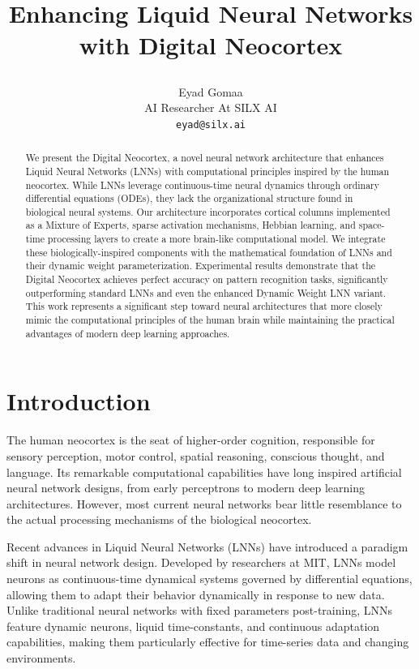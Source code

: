 \documentclass{article}
\title{Enhancing Liquid Neural Networks with Digital Neocortex

}
\author{
  Eyad Gomaa \\
  AI Researcher At SILX AI \\
  \texttt{eyad@silx.ai} \\
}
\begin{document}
\maketitle


\begin{abstract}
We present the Digital Neocortex, a novel neural network architecture that enhances Liquid Neural Networks (LNNs) with computational principles inspired by the human neocortex. While LNNs leverage continuous-time neural dynamics through ordinary differential equations (ODEs), they lack the organizational structure found in biological neural systems. Our architecture incorporates cortical columns implemented as a Mixture of Experts, sparse activation mechanisms, Hebbian learning, and space-time processing layers to create a more brain-like computational model. We integrate these biologically-inspired components with the mathematical foundation of LNNs and their dynamic weight parameterization. Experimental results demonstrate that the Digital Neocortex achieves perfect accuracy on pattern recognition tasks, significantly outperforming standard LNNs and even the enhanced Dynamic Weight LNN variant. This work represents a significant step toward neural architectures that more closely mimic the computational principles of the human brain while maintaining the practical advantages of modern deep learning approaches.
\end{abstract}



\section{Introduction}
The human neocortex is the seat of higher-order cognition, responsible for sensory perception, motor control, spatial reasoning, conscious thought, and language. Its remarkable computational capabilities have long inspired artificial neural network designs, from early perceptrons to modern deep learning architectures. However, most current neural networks bear little resemblance to the actual processing mechanisms of the biological neocortex.

Recent advances in Liquid Neural Networks (LNNs) have introduced a paradigm shift in neural network design. Developed by researchers at MIT, LNNs model neurons as continuous-time dynamical systems governed by differential equations, allowing them to adapt their behavior dynamically in response to new data. Unlike traditional neural networks with fixed parameters post-training, LNNs feature dynamic neurons, liquid time-constants, and continuous adaptation capabilities, making them particularly effective for time-series data and changing environments.
\end{document}

